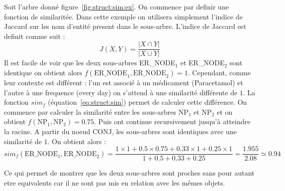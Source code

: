 \begin{example}
    Soit l'arbre donné figure~\ref{fig:struct:sim:ex}.
    On commence par definir une fonction de similaritée.
    Dans cette exemple on utilisera simplement l'indice de Jaccard \cite{jaccardDistributionFloreAlpine1901} sur les nom d'entité present dans le sous-arbre.
    L'indice de Jaccard est definit comme suit :
    \[
        J(X, Y) = \frac{\lvert X \cap Y \rvert}{\lvert X \cup Y \rvert}
    \]
    Il est facile de voir que les deux sous-arbres ER\_NODE$_1$ et ER\_NODE$_2$ sont identique on obtient alors $f(\text{ER\_NODE}_1, \text{ER\_NODE}_2) = 1$.
    Cependant, comme leur contexte est différent : l'un est associé à un médicament (Paracetamol) et l'autre à une frequence (every day) on s'attend à une similarité différente de $1$.
    La fonction $sim_f$ (équation~\ref{eq:struct:sim}) permet de calculer cette différence.
    On commence par calculer la similarité entre les sous-arbres NP$_1$ et NP$_2$ et on obtient $f(\text{NP}_1, \text{NP}_2) = 0.75$.
    Puis ont continue recursivement jusqu'à atteindre la racine.
    A partir du noeud CONJ, les sous-arbres sont identiques avec une similarité de $1$.
    On obtient alors :
    \[
        sim_f(\text{ER\_NODE}_1, \text{ER\_NODE}_2) = \frac{1 \times 1 + 0.5 \times 0.75 + 0.33 \times 1 + 0.25 \times 1}{1 + 0.5 + 0.33 + 0.25} = \frac{1.955}{2.08} \simeq 0.94
    \]

    Ce qui permet de montrer que les deux sous-arbres sont proches sans pour autant etre equivalents car il ne sont pas mis en relation avec les mêmes objets.



\end{example}

